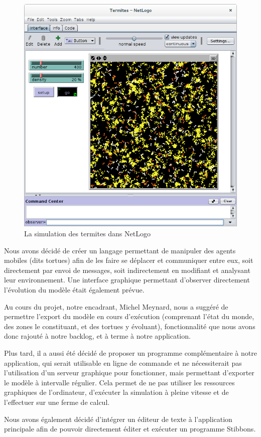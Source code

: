 \begin{figure}[h]
\centering
\includegraphics[scale=0.3]{doc/gestionProjet/netlogo-termites.png}
\caption{\label{netlogo-termites} La simulation des termites dans NetLogo}
\end{figure}

Nous avons décidé de créer un langage permettant de manipuler des agents mobiles (dits tortues) afin de les faire se déplacer et communiquer entre eux, soit directement par envoi de messages, soit indirectement en modifiant et analysant leur environnement. Une interface graphique permettant d'observer directement l'évolution du modèle était également prévue.

Au cours du projet, notre encadrant, Michel Meynard, nous a suggéré de permettre l'export du modèle en cours d'exécution (comprenant l'état du monde, des zones le constituant, et des tortues y évoluant), fonctionnalité que nous avons donc rajouté à notre backlog, et à terme à notre application.

Plus tard, il a aussi été décidé de proposer un programme complémentaire à notre application, qui serait utilisable en ligne de commande et ne nécessiterait pas l'utilisation d'un serveur graphique pour fonctionner, mais permettant d'exporter le modèle à intervalle régulier.
Cela permet de ne pas utiliser les ressources graphiques de l'ordinateur, d'exécuter la simulation à pleine vitesse et de l'effectuer sur une ferme de calcul.

Nous avons également décidé d'intégrer un éditeur de texte à l'application principale afin de pouvoir directement éditer et exécuter un programme Stibbons.
